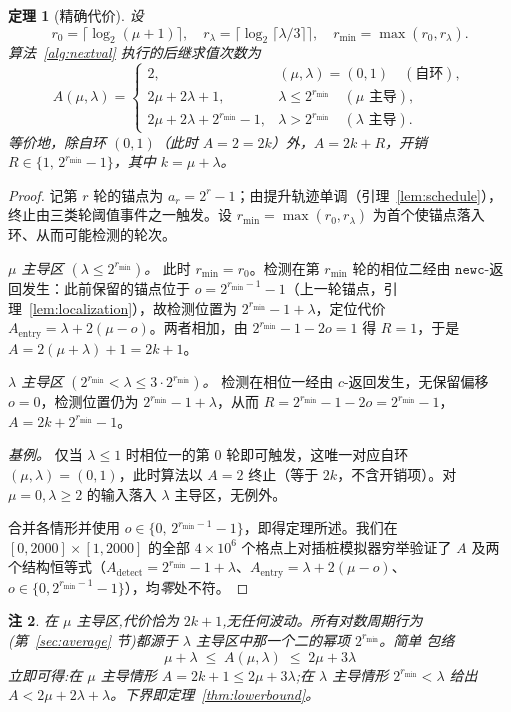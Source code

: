 \documentclass[11pt]{ctexart}
\newtheorem{theorem}{定理}[section]
\newtheorem{remark}[theorem]{注}
\newcommand{\newc}{\texttt{newc}}
\begin{document}
\begin{theorem}[精确代价]
\label{thm:closed-form}
设
\[
r_0=\lceil\log_2(\mu+1)\rceil,\quad
r_\lambda=\lceil\log_2\lceil\lambda/3\rceil\rceil,\quad
r_{\min}=\max(r_0,r_\lambda).
\]
算法~\ref{alg:nextval} 执行的后继求值次数为
\[
A(\mu,\lambda)=\begin{cases}
2, & (\mu,\lambda)=(0,1)\quad(自环),\\[2pt]
2\mu+2\lambda+1, & \lambda\le 2^{r_{\min}}\quad(\mu\text{ 主导}),\\[2pt]
2\mu+2\lambda+2^{r_{\min}}-1, & \lambda> 2^{r_{\min}}\quad(\lambda\text{ 主导}).
\end{cases}
\]
等价地，除自环 $(0,1)$（此时 $A=2=2k$）外，$A=2k+R$，开销 $R\in\{1,\,2^{r_{\min}}-1\}$，其中 $k=\mu+\lambda$。
\end{theorem}

\begin{proof}
记第 $r$ 轮的锚点为 $a_r=2^r-1$；由提升轨迹单调（引理~\ref{lem:schedule}），终止由三类轮阈值事件之一触发。设 $r_{\min}=\max(r_0,r_\lambda)$ 为首个使锚点落入环、从而可能检测的轮次。

\emph{$\mu$ 主导区 $(\lambda\le 2^{r_{\min}})$。} 此时 $r_{\min}=r_0$。检测在第 $r_{\min}$ 轮的相位二经由 $\newc$-返回发生：此前保留的锚点位于 $o=2^{r_{\min}-1}-1$（上一轮锚点，引理~\ref{lem:localization}），故检测位置为 $2^{r_{\min}}-1+\lambda$，定位代价 $A_{\mathrm{entry}}=\lambda+2(\mu-o)$。两者相加，由 $2^{r_{\min}}-1-2o=1$ 得 $R=1$，于是 $A=2(\mu+\lambda)+1=2k+1$。

\emph{$\lambda$ 主导区 $(2^{r_{\min}}<\lambda\le 3\cdot 2^{r_{\min}})$。} 检测在相位一经由 $c$-返回发生，无保留偏移 $o=0$，检测位置仍为 $2^{r_{\min}}-1+\lambda$，从而 $R=2^{r_{\min}}-1-2o=2^{r_{\min}}-1$，$A=2k+2^{r_{\min}}-1$。

\emph{基例。} 仅当 $\lambda\le 1$ 时相位一的第 $0$ 轮即可触发，这唯一对应自环 $(\mu,\lambda)=(0,1)$，此时算法以 $A=2$ 终止（等于 $2k$，不含开销项）。对 $\mu=0,\lambda\ge 2$ 的输入落入 $\lambda$ 主导区，无例外。

合并各情形并使用 $o\in\{0,\,2^{r_{\min}-1}-1\}$，即得定理所述。我们在 $[0,2000]\times[1,2000]$ 的全部 $4\times10^6$ 个格点上对插桩模拟器穷举验证了 $A$ 及两个结构恒等式（$A_{\mathrm{detect}}=2^{r_{\min}}-1+\lambda$、$A_{\mathrm{entry}}=\lambda+2(\mu-o)$、$o\in\{0,2^{r_{\min}-1}-1\}$），均\emph{零}处不符。
\end{proof}

\begin{remark}
在 $\mu$ 主导区,代价\emph{恰为} $2k+1$,无任何波动。所有对数周期行为
(第~\ref{sec:average} 节)都源于 $\lambda$ 主导区中那一个二的幂项 $2^{r_{\min}}$。简单
包络
\[
\mu+\lambda\;\le\;A(\mu,\lambda)\;\le\;2\mu+3\lambda
\]
立即可得:在 $\mu$ 主导情形 $A=2k+1\le 2\mu+3\lambda$;在 $\lambda$ 主导情形
$2^{r_{\min}}<\lambda$ 给出 $A<2\mu+2\lambda+\lambda$。下界即定理~\ref{thm:lowerbound}。
\end{remark}
\end{document}

